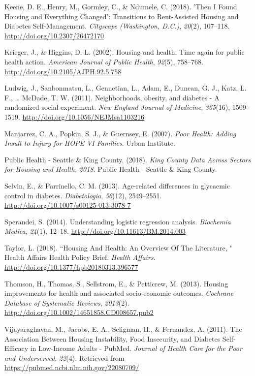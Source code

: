 \documentclass [11pt, proquest] {uwthesis}[2015/03/03]
\begin{document}
\hypertarget{ref-Keene2018}{}
Keene, D. E., Henry, M., Gormley, C., \& Ndumele, C. (2018). 'Then I
Found Housing and Everything Changed': Transitions to Rent-Assisted
Housing and Diabetes Self-Management. \emph{Cityscape (Washington,
D.C.)}, \emph{20}(2), 107--118. \url{http://doi.org/10.2307/26472170}

\hypertarget{ref-Krieger2002}{}
Krieger, J., \& Higgins, D. L. (2002). Housing and health: Time again
for public health action. \emph{American Journal of Public Health},
\emph{92}(5), 758--768. \url{http://doi.org/10.2105/AJPH.92.5.758}

\hypertarget{ref-Ludwig2011}{}
Ludwig, J., Sanbonmatsu, L., Gennetian, L., Adam, E., Duncan, G. J.,
Katz, L. F., \ldots{} McDade, T. W. (2011). Neighborhoods, obesity, and
diabetes - A randomized social experiment. \emph{New England Journal of
Medicine}, \emph{365}(16), 1509--1519.
\url{http://doi.org/10.1056/NEJMsa1103216}

\hypertarget{ref-Manjarrez2007}{}
Manjarrez, C. A., Popkin, S. J., \& Guernsey, E. (2007). \emph{Poor
Health: Adding Insult to Injury for HOPE VI Families}. Urban Institute.

\hypertarget{ref-PHSKC2018}{}
Public Health - Seattle \& King County. (2018). \emph{King County Data
Across Sectors for Housing and Health, 2018}. Public Health - Seattle \&
King County.

\hypertarget{ref-Selvin2013}{}
Selvin, E., \& Parrinello, C. M. (2013). Age-related differences in
glycaemic control in diabetes. \emph{Diabetologia}, \emph{56}(12),
2549--2551. \url{http://doi.org/10.1007/s00125-013-3078-7}

\hypertarget{ref-Sperandei2014}{}
Sperandei, S. (2014). Understanding logistic regression analysis.
\emph{Biochemia Medica}, \emph{24}(1), 12--18.
\url{http://doi.org/10.11613/BM.2014.003}

\hypertarget{ref-Taylor2018}{}
Taylor, L. (2018). ``Housing And Health: An Overview Of The Literature,
" Health Affairs Health Policy Brief. \emph{Health Affairs}.
\url{http://doi.org/10.1377/hpb20180313.396577}

\hypertarget{ref-Thomson2013}{}
Thomson, H., Thomas, S., Sellstrom, E., \& Petticrew, M. (2013). Housing
improvements for health and associated socio-economic outcomes.
\emph{Cochrane Database of Systematic Reviews}, \emph{2013}(2).
\url{http://doi.org/10.1002/14651858.CD008657.pub2}

\hypertarget{ref-Vijayaraghavan2011}{}
Vijayaraghavan, M., Jacobs, E. A., Seligman, H., \& Fernandez, A.
(2011). The Association Between Housing Instability, Food Insecurity,
and Diabetes Self-Efficacy in Low-Income Adults - PubMed. \emph{Journal
of Health Care for the Poor and Underserved}, \emph{22}(4). Retrieved
from \url{https://pubmed.ncbi.nlm.nih.gov/22080709/}
\end{document}

